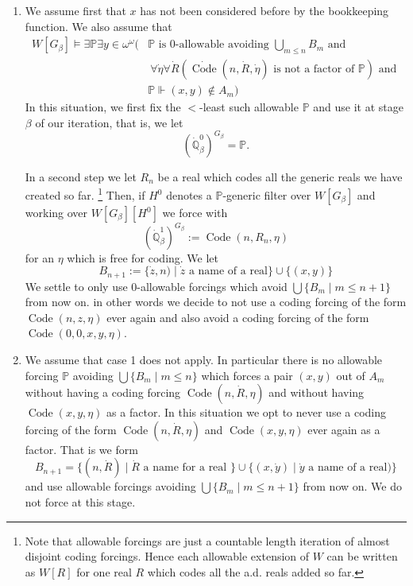 \documentclass[a4paper,11pt]{article}
\newcommand{\forceP}{\mathbb{P}}
\newcommand{\forceQ}{\mathbb{Q}}
\begin{document}
     \begin{enumerate}
         \item  We assume first that $x$ has not been considered before by the bookkeeping function. We also assume that
         \begin{align*}
       W[G_{\beta}] \models \exists \forceP \exists y \in \omega^{\omega} (&\forceP \text{ is 0-allowable avoiding } \bigcup_{m \le n}  B_m \text{ and }  \\&\ \forall \dot{\eta} \forall \dot{R} (\dot{\operatorname{Code}} (n,\dot{R},\dot{\eta}) \text{ is not a factor of } \forceP ) \text{ and }  \\& \forceP \Vdash (x,y) \notin A_m )
    \end{align*}
    In this situation, we first fix the $<$-least such allowable $\forceP$ and use it at stage $\beta$ of our iteration, that is, we let
    \[ (\dot{\forceQ}^0_{\beta})^{G_{\beta}} = \forceP. \] 
    
    
    In a second step we let $R_{n}$ be a real which codes all the generic reals we have created so far. \footnote{Note that allowable forcings are just a countable length iteration of almost disjoint coding forcings. Hence each allowable extension of $W$ can be written as $W[R]$ for one real $R$ which codes all the a.d. reals added so far.}
    Then, if $H^0$ denotes a $\forceP$-generic filter over $W[G_{\beta}]$ and working over $W[G_{\beta}] [H^0]$ we force with
    \[  (\dot{\forceQ}^1_{\beta})^{G_{\beta}}:=\operatorname{Code} ( n,R_{n},\eta) \]
    for an $\eta$ which is free for coding.
    We let \[ B_{n+1}:=  \{ \dot{z}, n) \mid \dot{z} \text{ a name of a real} \}  \cup \{ (x,y) \} \] 
We settle to only use 0-allowable forcings which avoid $\bigcup  \{B_{m} \mid m \le n+1 \}$ from now on.
in other words we decide to not use a coding forcing of the form $\operatorname{Code} (n,z,\eta)$ ever again and also avoid a coding forcing of the form $\operatorname{Code} (0,0,x,y,\eta)$.
\item  We assume that case 1 does not apply. In particular there is no allowable forcing  $\forceP$ avoiding $\bigcup \{ B_{m} \mid m \le n \}$  which forces a pair $(x,y)$ out of $A_m$ without having a coding forcing $\operatorname{Code} (n,\dot{R},\eta)$ and without having $\operatorname{Code} (x,y,\eta)$ as a factor. In this situation we opt to never use a coding forcing of the form
    $ \operatorname{Code} (n,\dot{R},\eta)$  and
     $\operatorname{Code} (x,y,\eta)$
    ever again as a factor. That is we form \[B_{n+1} = \{ (n,\dot{R}) \mid \dot{R} \text{ a name for a real } \} \cup \{(x,\dot{y}) \mid \dot{y} \text { a name of a real} ) \} \] and use allowable forcings avoiding $\bigcup \{B_{m} \mid m \le n+1 \}$ from now on. We do not force at this stage.  
    

\end{enumerate}
\end{document}
